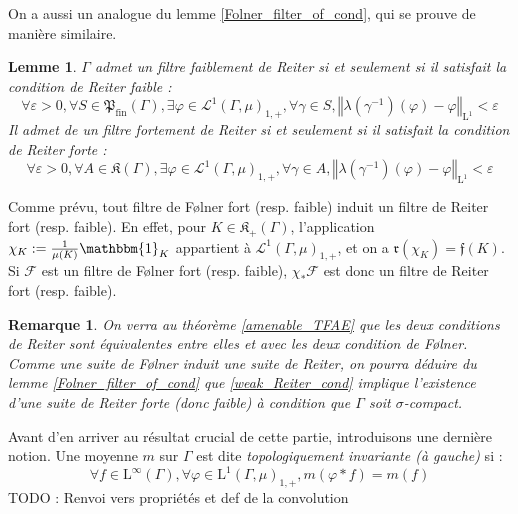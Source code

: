 \documentclass[a4paper,12pt]{article}
\newtheorem{lemma}[theorem]{Lemme}
\newtheorem{remark}[theorem]{Remarque}
\newcommand{\norm}[1]{\left\Vert #1\right\Vert}
\newcommand{\indic}{\mathbbm{1}}
\newcommand{\ssi}{si et seulement si }
\newcommand{\inv}{^{-1}}
\newcommand{\finparts}{\mathfrak{P}_{\mathrm{fin}}}
\newcommand{\TODO}[1]{{\color{red}TODO :} #1}
\begin{document}
On a aussi un analogue du lemme \ref{Folner_filter_of_cond}, qui se prouve de manière similaire.

\begin{lemma}\label{Reiter_filter_of_cond}
    $\Gamma$ admet un filtre faiblement de Reiter \ssi il satisfait la 
    \emph{condition de Reiter faible} :
    \begin{equation}\label{weak_Reiter_cond}\tag{WR}
        \forall\varepsilon>0, \forall S\in\finparts(\Gamma), \exists \varphi\in\mathscr{L}^1(\Gamma, \mu)_{1,+}, \forall \gamma\in S,
        \norm{\lambda(\gamma\inv)(\varphi)-\varphi}_{\mathrm{L}^1}<\varepsilon
    \end{equation}
    Il admet de un filtre fortement de Reiter \ssi il satisfait la \emph{condition de Reiter forte} : 
    \begin{equation}\label{strong_Reiter_cond}\tag{SR}
        \forall\varepsilon>0, \forall A\in\mathfrak{K}(\Gamma), \exists\varphi\in\mathscr{L}^1(\Gamma, \mu)_{1,+}, \forall\gamma\in A, 
        \norm{\lambda(\gamma\inv)(\varphi)-\varphi}_{\mathrm{L}^1}<\varepsilon
    \end{equation}

\end{lemma}

Comme prévu, tout filtre de F\o{}lner fort (resp. faible) induit un filtre de Reiter fort (resp. faible). En effet, pour $K\in\mathfrak{K}_+(\Gamma)$, l'application 
$\chi_K:=\frac1{\mu(K)}\indic_K$ appartient à $\mathscr{L}^1(\Gamma, \mu)_{1,+}$, et on a $\mathfrak{r}(\chi_K) = \mathfrak{f}(K)$.
Si $\mathscr{F}$ est un filtre de F\o{}lner fort (resp. faible), $\chi_*\mathscr{F}$ est donc un filtre de Reiter fort (resp. faible).

\begin{remark}
    On verra au théorème \ref{amenable_TFAE} que les deux conditions de Reiter sont équivalentes entre elles et avec les deux condition de 
    F\o{}lner. Comme une suite de F\o{}lner induit une suite de Reiter, on pourra déduire du lemme \ref{Folner_filter_of_cond} que \eqref{weak_Reiter_cond} implique l'existence d'une suite de Reiter 
    forte (donc faible) à condition que $\Gamma$ soit $\sigma$-compact.
\end{remark}

Avant d'en arriver au résultat crucial de cette partie, introduisons une dernière notion. Une moyenne $m$ sur $\Gamma$ est dite 
\emph{topologiquement invariante (à gauche)} si :
\begin{equation*}
    \forall f\in\mathrm{L}^\infty(\Gamma), \forall\varphi\in\mathrm{L}^1(\Gamma, \mu)_{1, +}, m(\varphi*f) = m(f)
\end{equation*}
\TODO{Renvoi vers propriétés et def de la convolution}
\end{document}
